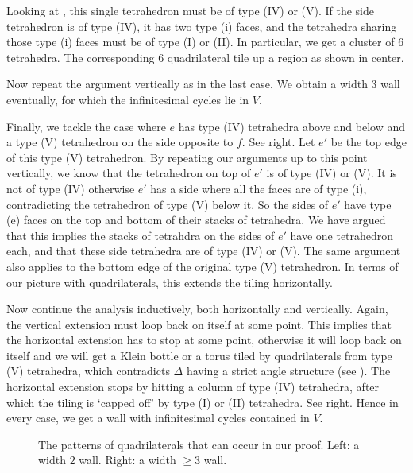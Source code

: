 \documentclass[12pt]{amsart}
\theoremstyle{definition}
\numberwithin{equation}{section}
\begin{document}
Looking at , this single tetrahedron must be of type (IV) or (V). If the side tetrahedron is of type (IV), it has two type (i) faces, and the tetrahedra sharing those type (i) faces must be of type (I) or (II). In particular, we get a cluster of 6 tetrahedra. The corresponding 6 quadrilateral tile up a region as shown in  center.

Now repeat the argument vertically as in the last case. We obtain a width $3$ wall eventually, for which the infinitesimal cycles lie in $V$.

Finally, we tackle the case where $e$ has type (IV) tetrahedra above and below and a type (V) tetrahedron on the side opposite to $f$. See  right. Let $e'$ be the top edge of this type (V) tetrahedron. By repeating our arguments up to this point vertically, we know that the tetrahedron on top of $e'$ is of type (IV) or (V). It is not of type (IV) otherwise $e'$ has a side where all the faces are of type (i), contradicting the tetrahedron of type (V) below it. So the sides of $e'$ have type (e) faces on the top and bottom of their stacks of tetrahedra. We have argued that this implies the stacks of tetrahdra on the sides of $e'$ have one tetrahedron each, and that these side tetrahedra are of type (IV) or (V). The same argument also applies to the bottom edge of the original type (V) tetrahedron. In terms of our picture with quadrilaterals, this extends the tiling horizontally.

Now continue the analysis inductively, both horizontally and vertically. Again, the vertical extension must loop back on itself at some point. This implies that the horizontal extension has to stop at some point, otherwise it will loop back on itself and we will get a Klein bottle or a torus tiled by quadrilaterals from type (V) tetrahedra, which contradicts $\Delta$ having a strict angle structure (see \cite[Theorem 1.5 and Corollary 3.11]{HRST11}). The horizontal extension stops by hitting a column of type (IV) tetrahedra, after which the tiling is `capped off' by type (I) or (II) tetrahedra. See  right. Hence in every case, we get a wall with infinitesimal cycles contained in $V$.

\begin{figure}
    \centering
    \fontsize{14pt}{14pt}\selectfont
    \resizebox{!}{6cm}{}
    \caption{The patterns of quadrilaterals that can occur in our proof. Left: a width $2$ wall. Right: a width $\geq 3$ wall.}
    \label{fig:wallarg2}
\end{figure}
\end{document}
